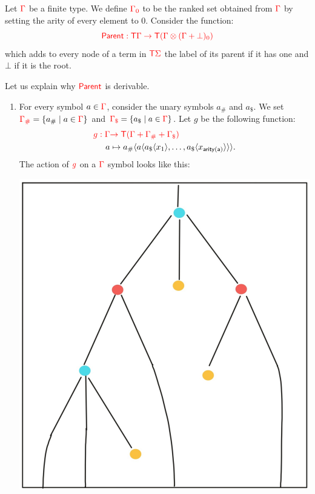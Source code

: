 \medskip
\noindent \begin{example}\label{ex:patternMatching} 
\end{example}


\medskip
\noindent \begin{example}  Let ${\color{red}{\Gamma}}$ be a finite type. We define ${\color{red}{{\color{red}{\Gamma}}_0}}$  to be the ranked set obtained from ${\color{red}{\Gamma}}$ by setting the arity of every element to $0$.  
\medskip
Consider the function:
$${\color{red}{ \mathsf{Parent}: {\color{red}{\mathsf T}}{\color{red}{\Gamma}}\to {\color{red}{\mathsf T}}({\color{red}{\Gamma}}\otimes ({\color{red}{\Gamma}}+\bot)_0)}}$$
which adds to every node of a term in ${\color{red}{\mathsf T}} {\color{red}{\Sigma}}$ the label  of its parent if it has one and $\bot$ if it is the root.

Let us explain why ${\color{red}{\mathsf{Parent}}}$ is derivable. 
\begin{enumerate}
\item For every symbol $a\in {\color{red}{\Gamma}}$, consider the unary symbols $a_\#$ and $a_\$$.
We set ${\color{red}{{\color{red}{\Gamma}}_\#}}=\{a_\#\mid a\in{\color{red}{\Gamma}}\}$ and ${\color{red}{{\color{red}{\Gamma}}_\$}}=\{a_\$\mid a\in{\color{red}{\Gamma}}\}$.
Let $g$ be the following function:
 \begin{align*}
{\color{red}{  g: {\color{red}{\Gamma}}}} &{\color{red}{\to {\color{red}{\mathsf T}}({\color{red}{\Gamma}}+{\color{red}{\Gamma}}_\#+{\color{red}{\Gamma}}_\$)}}\\
  a &\mapsto a_\#\langle{a\langle{a_\$\langle{x_1}\rangle,\dots,a_\$\langle{x_{\mathsf{arity(a)}}}\rangle}\rangle}\rangle.
\end{align*}
The action of ${\color{red}{g}}$ on a ${\color{red}{\Gamma}}$ symbol looks like this:
\begin{center}
\includegraphics[scale=.15]{MyPic1.jpg}

\end{center}
\end{enumerate}
\end{example}
